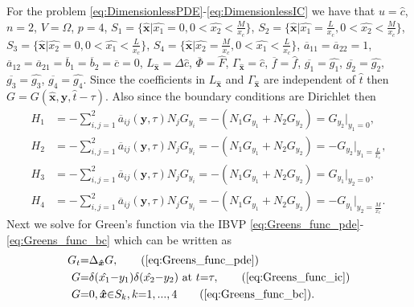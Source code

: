\documentclass[\main/thesis.tex]{subfiles}
\begin{document}
For the problem \eqref{eq:DimensionlessPDE}-\eqref{eq:DimensionlessIC} we have that $u {=} \hat{c}$, $n {=} 2$, 
$V {=} \Omega$, $p {=} 4$, \newline 
$S_1 {=} \{ \boldsymbol{\hat{x}} | \hat{x_1} {=} 0, 0 {<} \hat{x_2} {<} \frac{M}{x_c} \}$, 
$S_2 {=} \{ \boldsymbol{\hat{x}} | \hat{x_1} {=} \frac{L}{x_c}, 0 {<} \hat{x_2} {<} \frac{M}{x_c} \}$,
$S_3 {=} \{ \boldsymbol{\hat{x}} | \hat{x_2} {=} 0, 0 {<} \hat{x_1} {<} \frac{L}{x_c} \}$, \newline
$S_4 {=} \{ \boldsymbol{\hat{x}} | \hat{x_2} {=} \frac{M}{x_c}, 0 {<} \hat{x_1} {<} \frac{L}{x_c} \}$, $\overline{a}_{11} {=} \overline{a}_{22} {=} 1$,
$\overline{a}_{12} {=} \overline{a}_{21} {=} \overline{b}_1 {=} \overline{b}_2 {=} \overline{c} {=} 0$, 
$L_{\boldsymbol{\hat{x}}} {=} \Delta \hat{c}$, $\overline{\Phi} {=} \hat{F}$, $\Gamma_{\boldsymbol{\hat{x}}} {=} \hat{c}$, $\overline{f} {=} \hat{f}$,
$\overline{g_1} {=} \hat{g_1}$, $\overline{g_2} {=} \hat{g_2}$, $\overline{g_3} {=} \hat{g_3}$, $\overline{g_4} {=} \hat{g_4}$.
Since the coefficients in $L_{\boldsymbol{\hat{x}}}$ and $\Gamma_{\boldsymbol{\hat{x}}}$ are independent of $\hat{t}$ then $G {=} G(\boldsymbol{\hat{x}}, \boldsymbol{y}, \hat{t} {-} \tau)$. Also since the boundary conditions are Dirichlet then
\begin{align}
H_1 &{=} {-}\sum_{i,j{=}1}^{2} \overline{a}_{ij}(\boldsymbol{y}, \tau) N_j G_{y_i} {=} {-}(N_1 G_{y_1} {+} N_2 G_{y_2}) {=} G_{y_2} |_{y_1{=}0},
\label{eq:H1}\\
H_2 &{=} {-}\sum_{i,j{=}1}^{2} \overline{a}_{ij}(\boldsymbol{y}, \tau) N_j G_{y_i} {=} {-}(N_1 G_{y_1} {+} N_2 G_{y_2}) {=} {-}G_{y_2} |_{y_1{=}\frac{L}{x_c}},
\label{eq:H2}\\
H_3 & {=} {-}\sum_{i,j{=}1}^{2} \overline{a}_{ij}(\boldsymbol{y}, \tau) N_j G_{y_i} {=} {-}(N_1 G_{y_1} {+} N_2 G_{y_2}) {=} G_{y_1} |_{y_2{=}0},
\label{eq:H3}\\
H_4 &{=} {-}\sum_{i,j{=}1}^{2} \overline{a}_{ij}(\boldsymbol{y}, \tau) N_j G_{y_i} {=} {-}(N_1 G_{y_1} {+} N_2 G_{y_2}) {=} {-}G_{y_1} |_{y_2{=}\frac{M}{x_c}}
\label{eq:H4}.
\end{align}
Next we solve for Green's function via the IBVP \eqref{eq:Greens_func_pde}-\eqref{eq:Greens_func_bc} which can be written as
\begin{align*}
G_t &{=} \Delta_{\boldsymbol{\hat{x}}} G,\tag{\ref{eq:Greens_func_pde}}\\
G &{=} \delta(\hat{x_1}{-}y_1)\delta(\hat{x_2}{-}y_2) \text{ at } t {=} \tau,\tag{\ref{eq:Greens_func_ic}}\\
G &{=} 0, \boldsymbol{\hat{x}} {\in} S_k, k{=}1, ..., 4 \tag{\ref{eq:Greens_func_bc}}.
\end{align*}
\end{document}
